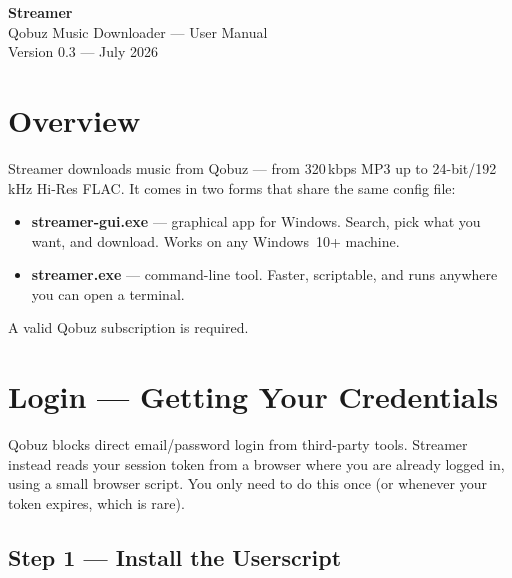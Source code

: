 \documentclass[11pt,a4paper]{article}
\begin{document}
\begin{center}
{\fontsize{28}{34}\selectfont\bfseries\color{accent} Streamer}\\[6pt]
{\large Qobuz Music Downloader --- User Manual}\\[4pt]
{\small Version 0.3 --- July 2026}
\end{center}

\vspace{1em}
\tableofcontents

\section{Overview}

Streamer downloads music from Qobuz --- from 320\,kbps MP3 up to
24-bit/192\,kHz Hi-Res FLAC.  It comes in two forms that share the same
config file:

\begin{itemize}
  \item \textbf{streamer-gui.exe} --- graphical app for Windows.  Search, pick
        what you want, and download.  Works on any Windows~10+ machine.
  \item \textbf{streamer.exe} --- command-line tool.  Faster, scriptable, and
        runs anywhere you can open a terminal.
\end{itemize}

A valid Qobuz subscription is required.

\section{Login --- Getting Your Credentials}

Qobuz blocks direct email/password login from third-party tools.  Streamer
instead reads your session token from a browser where you are already logged
in, using a small browser script.  You only need to do this once (or whenever
your token expires, which is rare).

\subsection{Step 1 --- Install the Userscript}
\end{document}
